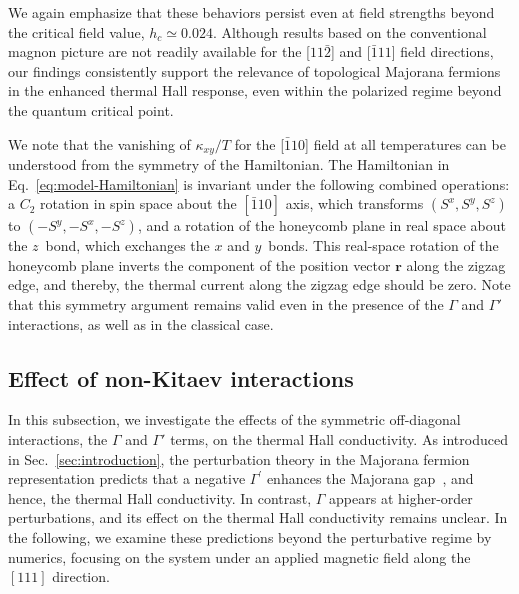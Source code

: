 \documentclass[twocolumn,superscriptaddress,showpacs, longbibliography, aps, prx]{revtex4-2}
\begin{document}
We again emphasize that these behaviors persist even at field strengths beyond the critical field value, $h_c \simeq 0.024$. 
Although results based on the conventional magnon picture are not readily available for the [$11\bar{2}$] and [$\bar{1}11$] field directions, our findings consistently support the relevance of topological Majorana fermions in the enhanced thermal Hall response, even within the polarized regime beyond the quantum critical point. 

We note that the vanishing of $\kappa_{xy}/T$ for the [$\bar{1}10$] field at all temperatures can be understood from the symmetry of the Hamiltonian.
The Hamiltonian in Eq.~\eqref{eq:model-Hamiltonian} is invariant under the following combined operations: 
a $C_2$ rotation in spin space about the $[\bar{1}10]$ axis, which transforms $(S^x,S^y,S^z)$ to $(-S^y,-S^x,-S^z)$, and a rotation of the honeycomb plane in real space about the $z$~bond, which exchanges the $x$ and $y$~bonds.
This real-space rotation of the honeycomb plane inverts the component of the position vector $\bm{r}$ along the zigzag edge, and thereby, the thermal current along the zigzag edge should be zero.
Note that this symmetry argument remains valid even in the presence of the $\Gamma$ and $\Gamma'$ interactions, as well as in the classical case.

\subsection{Effect of non-Kitaev interactions}
\label{sec:Gamma}
In this subsection, we investigate the effects of the symmetric off-diagonal interactions, the $\Gamma$ and $\Gamma'$ terms, on the thermal Hall conductivity.
As introduced in Sec.~\ref{sec:introduction}, the perturbation theory in the Majorana fermion representation predicts that a negative $\Gamma^{\prime}$ enhances the Majorana gap~\cite{TakikawaF2020}, and hence, the thermal Hall conductivity. 
In contrast, $\Gamma$ appears at higher-order perturbations, and its effect on the thermal Hall conductivity remains unclear.
In the following, we examine these predictions beyond the perturbative regime by numerics, focusing on the system under an applied magnetic field along the $[111]$ direction.
\end{document}
